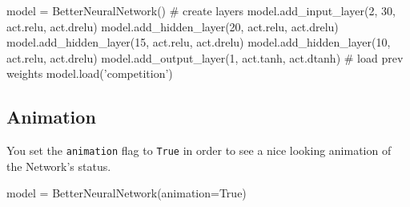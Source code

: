 \documentclass[11pt]{article}
\begin{document}
\begin{python}
model = BetterNeuralNetwork()
# create layers
model.add_input_layer(2, 30, act.relu, act.drelu)
model.add_hidden_layer(20, act.relu, act.drelu)
model.add_hidden_layer(15, act.relu, act.drelu)
model.add_hidden_layer(10, act.relu, act.drelu)
model.add_output_layer(1, act.tanh, act.dtanh)
# load prev weights
model.load('competition')
\end{python}
\subsection{Animation}
You set the \texttt{animation} flag to \texttt{True} in order to see a nice looking animation of the Network's status.
\begin{python}
model = BetterNeuralNetwork(animation=True)
\end{python}

\newpage
\printbibliography
\end{document}
